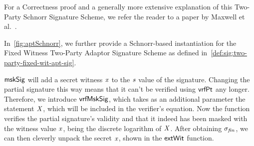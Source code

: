 For a Correctness proof and a generally more extensive explanation of this Two-Party Schnorr Signature Scheme, we refer the reader to a paper by Maxwell et al.~\cite{maxwell2019simple}.

In~\cref{fig:aptSchnorr}, we further provide a Schnorr-based instantiation for the Fixed Witness Two-Party Adaptor Signature Scheme as defined in~\cref{def:sig:two-party-fixed-wit-apt-sig}.

$\mathsf{mskSig}$ will add a secret witness $\mathit{x}$ to the $\mathit{s}$ value of the signature.
Changing the partial signature this way means that it can't be verified using $\mathsf{vrfPt}$ any longer.
Therefore, we introduce $\mathsf{vrfMskSig}$, which takes as an additional parameter the statement $\mathit{X}$, which will be included in the verifier's equation.
Now the function verifies the partial signature's validity and that it indeed has been masked with the witness value $\mathit{x}$, being the discrete logarithm of $\mathit{X}$.
After obtaining $\sigma_{\mathit{fin}}$, we can then cleverly unpack the secret $\mathit{x}$, shown in the $\mathsf{extWit}$ function.

